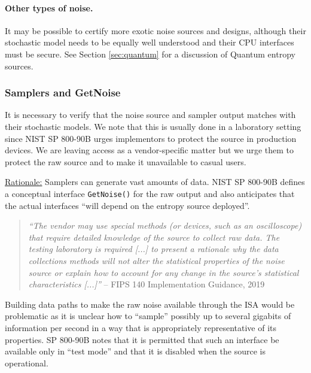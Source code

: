     \paragraph{Other types of noise.}
    It may be possible to certify more exotic noise sources and designs,
    although their stochastic model needs to be equally well understood
    and their CPU interfaces must be secure.
    See Section \ref{sec:quantum} for a discussion of Quantum entropy
    sources.


\subsubsection{Samplers and GetNoise}

    It is necessary to verify that the noise source and sampler output
    matches with their stochastic models. We note that this is
    usually done in a laboratory setting since NIST SP 800-90B \cite{TuBaKe+18}
    urges implementors to protect the source in production devices.
    We are leaving access as a vendor-specific matter but we urge them to
    protect the raw source and to make it unavailable to casual users.

    \underline{Rationale:}
    Samplers can generate vast amounts of data. NIST SP 800-90B
    \cite{TuBaKe+18} defines a conceptual interface \verb|GetNoise()|
    for the raw output and also anticipates that the actual
    interfaces ``will depend on the entropy source deployed''.

    \begin{quote}
    \emph{``The vendor may use special methods (or devices, such as an
    oscilloscope) that require detailed knowledge of the source to
    collect raw data. The testing laboratory is required [...] to
    present a rationale why the data collections methods will not alter
    the statistical properties
    of the noise source or explain how to account for any change
    in the source’s statistical characteristics [...]''}
    \flushright -- FIPS 140 Implementation Guidance, 2019 \cite{NICC19}
    \end{quote}

    Building data paths to make the raw noise available through the ISA
    would be problematic as it is unclear how to ``sample''
    possibly up to several gigabits of information per second in a way
    that is appropriately representative of its properties. SP 800-90B
    notes that it is permitted that such an interface be available only in
    ``test mode'' and that it is disabled when the source is operational.


